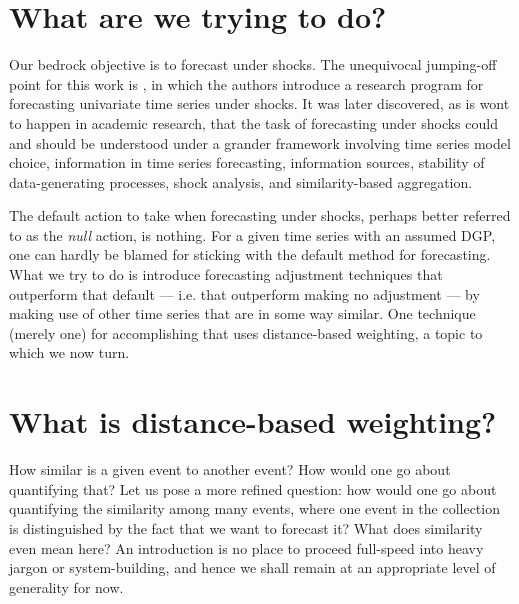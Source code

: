 \documentclass{uiucthesis2021}
\theoremstyle{definition}
\begin{document}
\section{What are we trying to do?}

Our bedrock objective is to forecast under shocks.  The unequivocal jumping-off point for this work is \cite[][]{lin2021minimizing}, in which the authors introduce a research program for forecasting univariate time series under shocks.  It was later discovered, as is wont to happen in academic research, that the task of forecasting under shocks could and should be understood under a grander framework involving time series model choice, information in time series forecasting, information sources, stability of data-generating processes, shock analysis, and similarity-based aggregation.  

The default action to take when forecasting under shocks, perhaps better referred to as the \textit{null} action, is nothing.  For a given time series with an assumed DGP, one can hardly be blamed for sticking with the default method for forecasting.  What we try to do is introduce forecasting adjustment techniques that outperform that default --- i.e. that outperform making no adjustment --- by making use of other time series that are in some way similar.  One technique (merely one) for accomplishing that uses distance-based weighting, a topic to which we now turn.


\section{What is distance-based weighting?}
How similar is a given event to another event?  How would one go about quantifying that?  Let us pose a more refined question: how would one go about quantifying the similarity among many events, where one event in the collection is distinguished by the fact that we want to forecast it?  What does similarity even mean here?  An introduction is no place to proceed full-speed into heavy jargon or system-building, and hence we shall remain at an appropriate level of generality for now.
\end{document}

